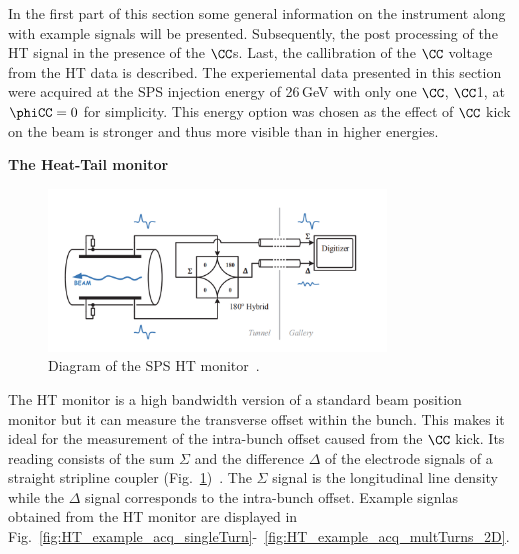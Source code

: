  In the first part of this section some general information on the instrument along with example signals will be presented. Subsequently, the post processing of the HT signal in the presence of the $\CC$s. Last, the callibration of the $\CC$ voltage from the HT data is described. The experiemental data presented in this section were acquired at the SPS injection energy of 26\,GeV with only one $\CC$, $\CC$1, at $\phiCC=0$ for simplicity. This energy option was chosen as the effect of $\CC$ kick on the beam is stronger and thus more visible than in higher energies.



\normalsize{\textbf{The Heat-Tail monitor}}\\
\begin{figure}[h]
   \centering         
   \includegraphics[width=0.8\textwidth]{images/Ch4/SPS_HT_monitor_diagram_modified.png}
       \caption{Diagram of the SPS HT monitor~\cite{Levens:2313358}.}
       \label{fig:SPS_HT_diagram}
\end{figure}
The HT monitor is a high bandwidth version of a standard beam position monitor but it can measure the transverse offset within the bunch. This makes it ideal for the measurement of the intra-bunch offset caused from the $\CC$ kick. Its reading consists of the sum $\Sigma$ and the  difference $\Delta$ of the electrode signals of a straight stripline coupler (Fig.~\ref{fig:SPS_HT_diagram})~\cite{Jones:987561, Levens:2313358}. The $\Sigma$ signal is the longitudinal line density while the $\Delta$ signal corresponds to the intra-bunch offset. Example signlas obtained from the HT monitor are displayed in Fig.~\ref{fig:HT_example_acq_singleTurn}-~\ref{fig:HT_example_acq_multTurns_2D}.


